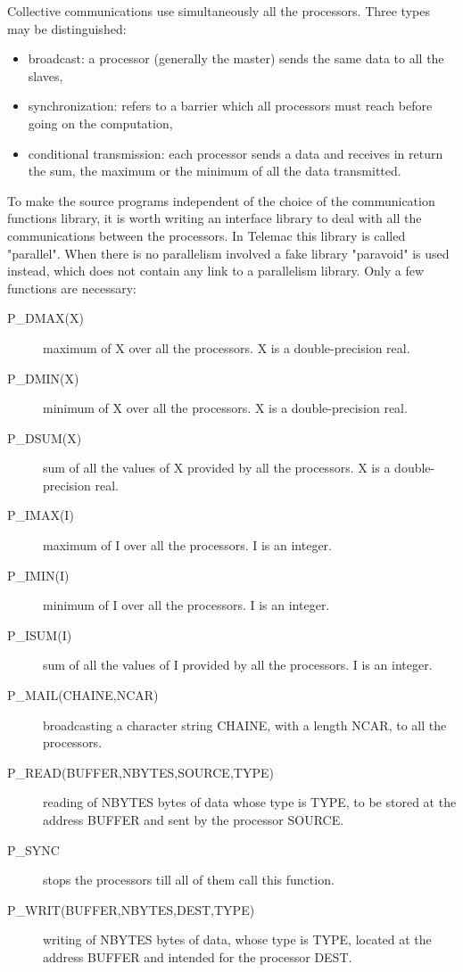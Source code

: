 Collective communications use simultaneously all the processors. Three types
may be distinguished:
\begin{itemize}
  \item broadcast: a processor (generally the master) sends the same data to
    all the slaves,

  \item synchronization: refers to a barrier which all processors must reach
    before going on the computation,

  \item conditional transmission: each processor sends a data and receives in
    return the sum, the maximum or the minimum of all the data transmitted.
\end{itemize}
To make the source programs independent of the choice of the communication
functions library, it is worth writing an interface library to deal with all
the communications between the processors. In Telemac this library is called
"parallel". When there is no parallelism involved a fake library "paravoid" is
used instead, which does not contain any link to a parallelism library. Only a
few functions are necessary:
\begin{description}
  \item [P\_DMAX(X)] maximum of X over all the processors. X is a
    double-precision real.
  \item [P\_DMIN(X)] minimum of X over all the processors. X is a
    double-precision real.
  \item [P\_DSUM(X)] sum of all the values of X provided by all the processors.
    X is a double-precision real.
  \item [P\_IMAX(I)] maximum of I over all the processors. I is an integer.
  \item [P\_IMIN(I)] minimum of I over all the processors. I is an integer.
  \item [P\_ISUM(I)] sum of all the values of I provided by all the processors.
    I is an integer.
  \item [P\_MAIL(CHAINE,NCAR)] broadcasting a character string CHAINE, with a
    length NCAR, to all the processors.
  \item [P\_READ(BUFFER,NBYTES,SOURCE,TYPE)] reading of NBYTES bytes of data
    whose type is TYPE, to be stored at the address BUFFER and sent by the
    processor SOURCE.
  \item [P\_SYNC] stops the processors till all of them call this function.
  \item [P\_WRIT(BUFFER,NBYTES,DEST,TYPE)] writing of NBYTES bytes of data,
    whose type is TYPE, located at the address BUFFER and intended for the
    processor DEST.
\end{description}


